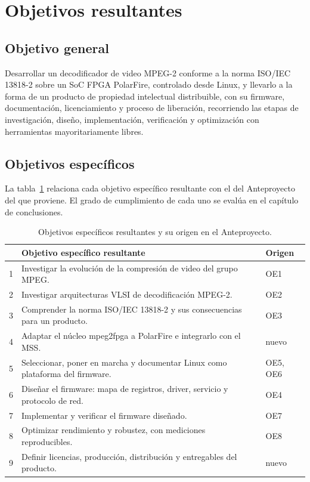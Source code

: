 \section{Objetivos resultantes}

\subsection{Objetivo general}

Desarrollar un decodificador de video MPEG-2 conforme a la norma ISO/IEC
13818-2 sobre un SoC FPGA PolarFire, controlado desde Linux, y llevarlo a la
forma de un producto de propiedad intelectual distribuible, con su firmware,
documentación, licenciamiento y proceso de liberación, recorriendo las etapas
de investigación, diseño, implementación, verificación y optimización con
herramientas mayoritariamente libres.

\subsection{Objetivos específicos}

La tabla~\ref{tab:objetivos-trazabilidad} relaciona cada objetivo específico
resultante con el del Anteproyecto del que proviene. El grado de
cumplimiento de cada uno se evalúa en el capítulo de conclusiones.

\begin{table}[ht]
  \centering\small
  \begin{tabularx}{\linewidth}{@{}l X l@{}}
    \toprule
    & \textbf{Objetivo específico resultante} & \textbf{Origen} \\
    \midrule
    1 & Investigar la evolución de la compresión de video del grupo MPEG. & OE1 \\
    2 & Investigar arquitecturas VLSI de decodificación MPEG-2. & OE2 \\
    3 & Comprender la norma ISO/IEC 13818-2 y sus consecuencias para un producto. & OE3 \\
    4 & Adaptar el núcleo mpeg2fpga a PolarFire e integrarlo con el MSS. & nuevo \\
    5 & Seleccionar, poner en marcha y documentar Linux como plataforma del firmware. & OE5, OE6 \\
    6 & Diseñar el firmware: mapa de registros, driver, servicio y protocolo de red. & OE4 \\
    7 & Implementar y verificar el firmware diseñado. & OE7 \\
    8 & Optimizar rendimiento y robustez, con mediciones reproducibles. & OE8 \\
    9 & Definir licencias, producción, distribución y entregables del producto. & nuevo \\
    \bottomrule
  \end{tabularx}
  \caption{Objetivos específicos resultantes y su origen en el Anteproyecto.}
  \label{tab:objetivos-trazabilidad}
\end{table}

